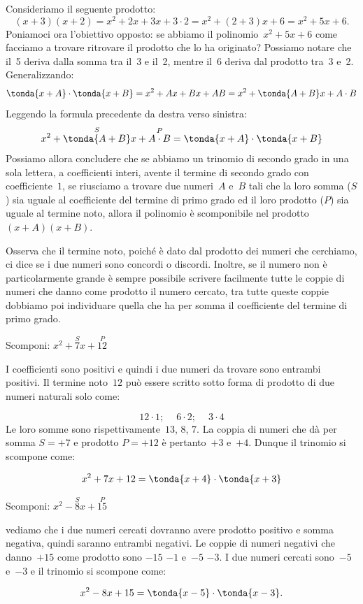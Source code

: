 Consideriamo il seguente prodotto:
\[(x+3)(x+2)=x^2+2x+3x+3 \cdot 2=x^2+(2+3)x+6=x^2+5x+6.\]
Poniamoci ora l'obiettivo opposto: se abbiamo il
polinomio~\(x^2+5x+6\) come facciamo a trovare ritrovare il prodotto
che lo ha originato? Possiamo notare che il~5 deriva dalla somma tra
il~3 e il~2, mentre il~6 deriva dal prodotto tra~3 e~2. Generalizzando:
\[\tonda{x+A}\cdot \tonda{x+B}=
  x^{{2}}+Ax+Bx+AB=x^2+\tonda{A+B}x+A\cdot B\]
Leggendo la formula precedente da destra verso sinistra:
\[x^{{2}}+\overset{S}{\tonda{A+B}}x+\overset{P}{A \cdot B}
=\tonda{x+A}\cdot\tonda{x+B}\]
Possiamo allora concludere che se abbiamo un trinomio di secondo grado
in una sola lettera, a coefficienti interi, avente il termine di
secondo grado con coefficiente~\(1\), se riusciamo a trovare due 
numeri~\(A\) e~\(B\) tali che la loro somma (\(S\)) sia uguale al
coefficiente del termine di primo grado ed il loro prodotto (\(P\)) sia 
uguale al termine noto, allora il polinomio è scomponibile nel 
prodotto~\((x+A)(x+B)\).

Osserva che il termine noto, poiché è dato dal prodotto dei numeri
che cerchiamo, ci dice se i due numeri sono concordi o discordi.
Inoltre, se il numero non è particolarmente grande è sempre
possibile scrivere facilmente tutte le coppie di numeri che danno come
prodotto il numero cercato, tra tutte queste coppie dobbiamo poi
individuare quella che ha per somma il coefficiente del termine di
primo grado.

\begin{esempio}{}{}
Scomponi: \(x^2+\overset{S}{7}x+\overset{P}{12}\)

I coefficienti sono positivi e quindi i due numeri da trovare sono
entrambi positivi.
Il termine noto~\(12\) può essere scritto sotto forma di prodotto di due
numeri naturali solo come:

\vspace{-1.0em}
\[12\cdot 1;\quad~6\cdot 2;\quad~3\cdot 4\]
Le loro somme sono rispettivamente~\(13\), \(8\), \(7\). 
La coppia di numeri che dà per somma \(S=+7\) e prodotto \(P=+12\) è 
pertanto~\(+3\) e~\(+4\). 
Dunque il trinomio si scompone come:

\vspace{-1.0em}
\[x^2+7x+12=\tonda{x+4} \cdot \tonda{x+3}\]
\end{esempio}

\begin{esempio}{}{}
Scomponi: \(x^2-\overset{S}{8}x+\overset{P}{15}\)

vediamo che i due numeri cercati dovranno avere 
prodotto positivo e somma negativa, quindi saranno entrambi negativi. 
Le coppie di numeri negativi che danno~\(+15\) come prodotto sono \(-15\) 
\(-1\) e~\(-5\) \(-3\).
I due numeri cercati sono~\(-5\) e~\(-3\) e il trinomio si scompone come:

\vspace{-1.0em}
\[x^2-8x+15=\tonda{x-5}\cdot \tonda{x-3}.\]
\end{esempio}


